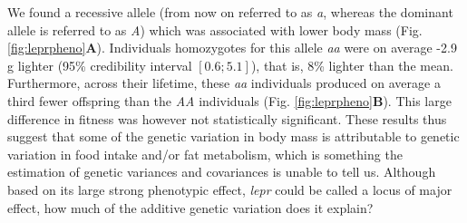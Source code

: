 We found a recessive allele (from now on referred to as \emph{a}, whereas the dominant allele is referred to as \emph{A}) which was associated with lower body mass (Fig. \ref{fig:leprpheno}\textbf{A}). Individuals homozygotes for this allele \emph{aa} were on average -2.9 g lighter (95\% credibility interval $[0.6;5.1]$), that is, 8\% lighter than the mean. Furthermore, across their lifetime, these \emph{aa} individuals produced on average a third fewer offspring than the \emph{AA} individuals (Fig. \ref{fig:leprpheno}\textbf{B}). This large difference in fitness was however not statistically significant. These results thus suggest that some of the genetic variation in body mass is attributable to genetic variation in food intake and/or fat metabolism, which is something the estimation of genetic variances and covariances is unable to tell us. 
Although based on its large strong phenotypic effect, \emph{lepr} could be called a locus of major effect, how much of the additive genetic variation does it explain?

